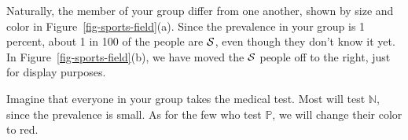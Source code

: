 \documentclass[
  letterpaper,
  DIV=11,
  numbers=noendperiod,
  oneside]{scrartcl}
\begin{document}
Naturally, the member of your group differ from one another, shown by
size and color in Figure~\ref{fig-sports-field}(a). Since the prevalence
in your group is 1 percent, about 1 in 100 of the people are
\({\cal S}\), even though they don't know it yet. In
Figure~\ref{fig-sports-field}(b), we have moved the \({\cal S}\) people
off to the right, just for display purposes.

Imagine that everyone in your group takes the medical test. Most will
test \({\mathbb{N}}\), since the prevalence is small. As for the few who
test \({\mathbb{P}}\), we will change their color to red.

\begin{figure}

\begin{minipage}{0.50\linewidth}


\subcaption{\label{fig-sports-field-test-1}}

\end{minipage}%
%
\begin{minipage}{0.50\linewidth}

\end{minipage}
\end{figure}
\end{document}

